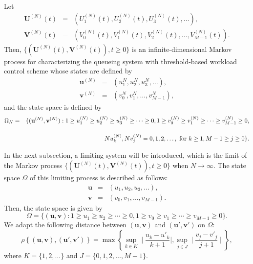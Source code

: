 \documentclass[12pt]{article}
\begin{document}
 Let
\begin{eqnarray*}
  \displaystyle \mathbf{U}^{(N)}(t) &=& \left(U^{(N)}_{1}(t), U^{(N)}_{2}(t), U^{(N)}_{3}(t),\ldots \right), \\[4mm]
 \displaystyle \mathbf{V}^{(N)}(t)&=& \left(V^{(N)}_{0}(t), V^{(N)}_{1}(t),V^{(N)}_{2}(t), \ldots, V^{(N)}_{M-1}(t)\right).
\end{eqnarray*}
Then, $\displaystyle \{(\mathbf{U}^{(N)}(t), \mathbf{V}^{(N)}(t)), t\geq0\}$ is an infinite-dimensional Markov process for characterizing the queueing system with threshold-based workload control scheme whose states are defined by
\begin{eqnarray*}
  \mathbf{u}^{(N)}&=&(u_1^N, u_2^N, u_3^N, \ldots),\\[4mm]
  \mathbf{v}^{(N)}&=&(v_0^N, v_1^N, \ldots, v_{M-1}^N),
\end{eqnarray*}
and the state space is defined by
\begin{eqnarray*}
  \displaystyle \Omega_{N} &=&  \{(\textbf{u}^{(N)}, \textbf{v}^{(N)}): 1\geq u_1^{(N)}\geq u_2^{(N)}\geq u_3^{(N)}\geq \cdots \geq0,\displaystyle 1\geq v_0^{(N)}\geq v_1^{(N)}\geq \cdots\geq v_{M-1}^{(N)} \geq 0, \\[4mm]
  && \displaystyle  Nu_k^{(N)}, Nv_j^{(N)}=0,1,2,\ldots,\textmd{ for } k\geq1, M-1\geq j\geq0\}.
\end{eqnarray*}

In the next subsection, a limiting system will be introduced, which is the limit of the Markov process $\displaystyle \{(\mathbf{U}^{(N)}(t), \mathbf{V}^{(N)}(t)), t\geq0\}$ when $N\longrightarrow \infty$. The state space $\Omega$ of this limiting process is described as follows:
\begin{eqnarray*}
  \mathbf{u}&=&(u_1, u_2, u_3, \ldots),\\[4mm]
            \mathbf{v}&=&(v_0,v_1,\ldots,v_{M-1}).
\end{eqnarray*}
Then, the state space is given by
\begin{equation*}
   \displaystyle \Omega=\{(\mathbf{u},\mathbf{v}): 1\geq u_1\geq u_2\geq \cdots\geq0, \displaystyle 1\geq v_0\geq v_1\geq \cdots\geq  v_{M-1} \geq0\}.
\end{equation*}
We adapt the following distance between $(\mathbf{u},\mathbf{v})$ and $(\mathbf{u}',\mathbf{v}')$ on $\Omega$:
\[\displaystyle \rho\left\{(\mathbf{u},\mathbf{v}),(\mathbf{u}',\mathbf{v}')\right\}
=\max\displaystyle\left\{\displaystyle\sup\limits_{k\in K}\mid\frac{u_k-u'_k}{k+1}\mid,\displaystyle \sup\limits_{j\in J}\mid\frac{v_j-v'_j}{j+1}\mid\right\},\]
where $K=\{1,2,\ldots\}$ and $J=\{0,1,2,\ldots,M-1\}$.
\end{document}
